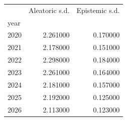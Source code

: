\begin{tabular}{lrr}
\toprule
 & Aleatoric s.d. & Epistemic s.d. \\
year &  &  \\
\midrule
2020 & 2.261000 & 0.170000 \\
2021 & 2.178000 & 0.151000 \\
2022 & 2.298000 & 0.184000 \\
2023 & 2.261000 & 0.164000 \\
2024 & 2.181000 & 0.157000 \\
2025 & 2.192000 & 0.125000 \\
2026 & 2.113000 & 0.123000 \\
\bottomrule
\end{tabular}
